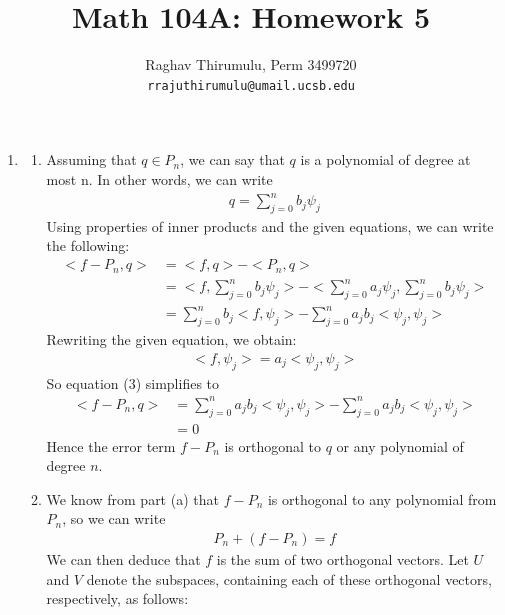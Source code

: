 \documentclass{article}
\begin{document}
\title{Math 104A: Homework 5}
\author{Raghav Thirumulu, Perm 3499720 \\ \texttt{rrajuthirumulu@umail.ucsb.edu}}
\maketitle

\begin{enumerate}
    \item %
        \begin{enumerate}
            \item 
            Assuming that $q \in P_n $, we can say that $q$ is a polynomial of degree at most n. In other words, we can write
            \begin{align*}
                q = \sum_{j=0}^{n} b_j\psi_j
            \end{align*}
            Using properties of inner products and the given equations, we can write the following:
            \begin{align}
            <f-P_n,q> &= <f,q> - <P_n,q> \\
                      &= <f,\sum_{j=0}^{n} b_j\psi_j> - <\sum_{j=0}^{n} a_j\psi_j, \sum_{j=0}^{n} b_j\psi_j> \\
                      &= \sum_{j=0}^{n} b_j <f,\psi_j> - \sum_{j=0}^{n} a_jb_j <\psi_j,\psi_j>
            \end{align}
            Rewriting the given equation, we obtain:
            \begin{align*}
            <f,\psi_j> = a_j<\psi_j,\psi_j>
            \end{align*}
            So equation (3) simplifies to 
            \begin{align*}
            <f-P_n,q> &= \sum_{j=0}^{n} a_jb_j <\psi_j,\psi_j> - \sum_{j=0}^{n} a_jb_j <\psi_j,\psi_j> \\
                      &= 0
            \end{align*}
            Hence the error term $ f - P_n $ is orthogonal to $q$ or any polynomial of degree $n$.
            \item
            We know from part (a) that $ f - P_n $ is orthogonal to any polynomial from $P_n$, so we can write 
            \begin{align*}
                P_n + (f-P_n) = f
            \end{align*}
            We can then deduce that $f$ is the sum of two orthogonal vectors. Let $U$ and $V$ denote the subspaces, containing each of these orthogonal vectors, respectively, as follows:

\end{enumerate}
\end{enumerate}
\end{document}

